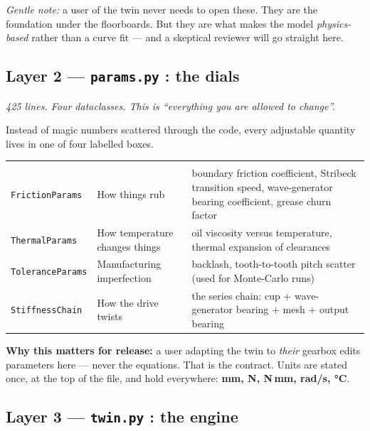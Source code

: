 \documentclass[11pt,a4paper]{article}
\newcommand{\pkg}[1]{\texttt{#1}}
\begin{document}
\vspace{6pt}
\noindent\emph{Gentle note:} a user of the twin never needs to open these. They
are the foundation under the floorboards. But they are what makes the model
\emph{physics-based} rather than a curve fit --- and a skeptical reviewer will
go straight here.

\subsection{Layer 2 --- \pkg{params.py} : the dials}

\emph{425 lines. Four dataclasses. This is ``everything you are allowed to
change''.}

Instead of magic numbers scattered through the code, every adjustable quantity
lives in one of four labelled boxes.

\begin{tabularx}{\textwidth}{@{}l Y Y@{}}
 &  &  \\
\pkg{FrictionParams} & How things rub & boundary friction coefficient, Stribeck
transition speed, wave-generator bearing coefficient, grease churn factor \\
\pkg{ThermalParams} & How temperature changes things & oil viscosity versus
temperature, thermal expansion of clearances \\
\pkg{ToleranceParams} & Manufacturing imperfection & backlash, tooth-to-tooth
pitch scatter (used for Monte-Carlo runs) \\
\pkg{StiffnessChain} & How the drive twists & the series chain: cup +
wave-generator bearing + mesh + output bearing \\
\end{tabularx}

\vspace{6pt}
\noindent\textbf{Why this matters for release:} a user adapting the twin to
\emph{their} gearbox edits parameters here --- never the equations. That is the
contract. Units are stated once, at the top of the file, and hold everywhere:
\textbf{mm, N, N\,mm, rad/s, °C}.

\subsection{Layer 3 --- \pkg{twin.py} : the engine}
\end{document}
